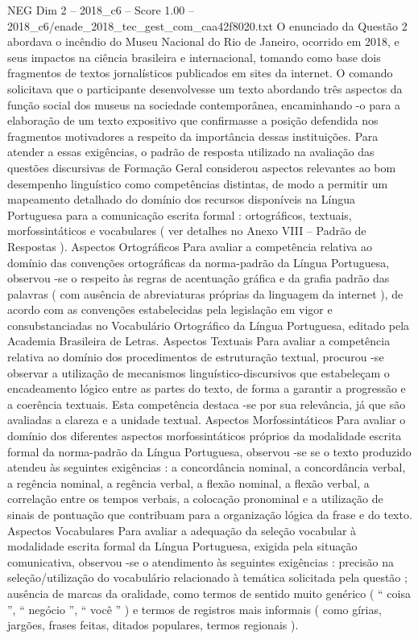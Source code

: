 \begin{textsample}{NEG Dim 2 – 2018\_c6 – Score 1.00 – 2018\_c6/enade\_2018\_tec\_gest\_com\_caa42f8020.txt}
O enunciado da Questão 2 abordava o incêndio do Museu Nacional do Rio de Janeiro, ocorrido em 2018, e seus impactos na ciência brasileira e internacional, tomando como base dois fragmentos de textos jornalísticos publicados em sites da internet.
O comando solicitava que o participante desenvolvesse um texto abordando três aspectos da função social dos museus na sociedade contemporânea, encaminhando -o para a elaboração de um texto expositivo que confirmasse a posição defendida nos fragmentos motivadores a respeito da importância dessas instituições.
Para atender a essas exigências, o padrão de resposta utilizado na avaliação das questões discursivas de Formação Geral considerou aspectos relevantes ao bom desempenho linguístico como competências distintas, de modo a permitir um mapeamento detalhado do domínio dos recursos disponíveis na Língua Portuguesa para a comunicação escrita formal : ortográficos, textuais, morfossintáticos e vocabulares ( ver detalhes no Anexo VIII – Padrão de Respostas ).
Aspectos Ortográficos Para avaliar a competência relativa ao domínio das convenções ortográficas da norma-padrão da Língua Portuguesa, observou -se o respeito às regras de acentuação gráfica e da grafia padrão das palavras ( com ausência de abreviaturas próprias da linguagem da internet ), de acordo com as convenções estabelecidas pela legislação em vigor e consubstanciadas no Vocabulário Ortográfico da Língua Portuguesa, editado pela Academia Brasileira de Letras.
Aspectos Textuais Para avaliar a competência relativa ao domínio dos procedimentos de estruturação textual, procurou -se observar a utilização de mecanismos linguístico-discursivos que estabeleçam o encadeamento lógico entre as partes do texto, de forma a garantir a progressão e a coerência textuais.
Esta competência destaca -se por sua relevância, já que são avaliadas a clareza e a unidade textual.
Aspectos Morfossintáticos Para avaliar o domínio dos diferentes aspectos morfossintáticos próprios da modalidade escrita formal da norma-padrão da Língua Portuguesa, observou -se se o texto produzido atendeu às seguintes exigências : a concordância nominal, a concordância verbal, a regência nominal, a regência verbal, a flexão nominal, a flexão verbal, a correlação entre os tempos verbais, a colocação pronominal e a utilização de sinais de pontuação que contribuam para a organização lógica da frase e do texto.
Aspectos Vocabulares Para avaliar a adequação da seleção vocabular à modalidade escrita formal da Língua Portuguesa, exigida pela situação comunicativa, observou -se o atendimento às seguintes exigências : precisão na seleção/utilização do vocabulário relacionado à temática solicitada pela questão ; ausência de marcas da oralidade, como termos de sentido muito genérico ( “ coisa ”, “ negócio ”, “ você ” ) e termos de registros mais informais ( como gírias, jargões, frases feitas, ditados populares, termos regionais ).

\end{textsample}
